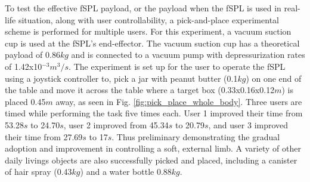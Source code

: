 \documentclass[letterpaper, 10 pt, conference]{ieeeconf}  %
\begin{document}
To test the effective fSPL payload, or the payload when the fSPL is used in real-life situation, along with user controllability, a pick-and-place experimental scheme is performed for multiple users. For this experiment, a vacuum suction cup is used at the fSPL's end-effector. The vacuum suction cup has a theoretical payload of 0.86$kg$ and is connected to a vacuum pump with depressurization rates of 1.42x10$^{-3}m^3/s$. The experiment is set up for the user to operate the fSPL using a joystick controller to, pick a jar with peanut butter (0.1$kg$) on one end of the table and move it across the table where a target box (0.33x0.16x0.12$m$) is placed 0.45$m$ away, as seen in Fig. \ref{fig:pick_place_whole_body}. Three users are timed while performing the task five times each.  User 1 improved their time from 53.28$s$ to 24.70$s$, user 2 improved from 45.34$s$ to 20.79$s$, and user 3 improved their time from 27.69$s$ to 17$s$. Thus preliminary demonstrating the gradual adoption and improvement in controlling a soft, external limb. A variety of other daily livings objects are also successfully picked and placed, including a canister of hair spray (0.43$kg$) and a water bottle 0.88$kg$.
% 
% 
% 
% 
% 
% 




\end{document}
